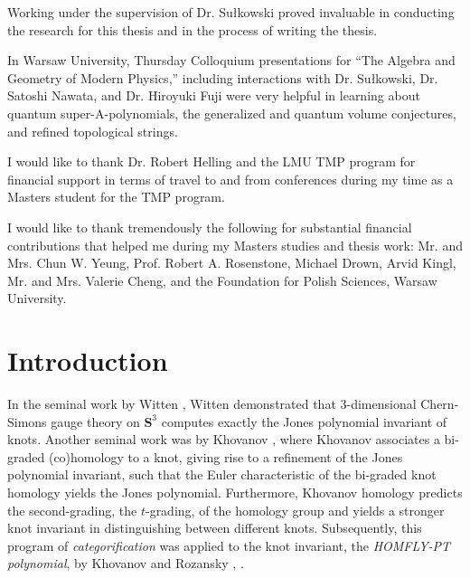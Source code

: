 \documentclass[a4paper,titlepage,twoside]{book}
\begin{document}
Working under the supervision of Dr. Su\l kowski proved invaluable in conducting the research for this thesis and in the process of writing the thesis.  

In Warsaw University, Thursday Colloquium presentations for ``The Algebra and Geometry of Modern Physics,'' including interactions with Dr. Su\l kowski, Dr. Satoshi Nawata, and Dr. Hiroyuki Fuji were very helpful in learning about quantum super-A-polynomials, the generalized and quantum volume conjectures, and refined topological strings.

I would like to thank Dr. Robert Helling and the LMU TMP program for financial support in terms of travel to and from conferences during my time as a Masters student for the TMP program.

I would like to thank tremendously the following for substantial financial contributions that helped me during my Masters studies and thesis work: Mr. and Mrs. Chun W. Yeung, Prof. Robert A. Rosenstone, Michael Drown, Arvid Kingl, Mr. and Mrs. Valerie Cheng, and the Foundation for Polish Sciences, Warsaw University.  


\newpage
\thispagestyle{empty}


\newpage
\tableofcontents


\newpage
\thispagestyle{empty}

\newpage

\chapter{Introduction}

In the seminal work by Witten \cite{Witten1989}, Witten demonstrated that 3-dimensional Chern-Simons gauge theory on $\mathbf{S}^3$ computes exactly the Jones polynomial invariant of knots.  Another seminal work was by Khovanov \cite{Khovanov2000}, where Khovanov associates a bi-graded (co)homology to a knot, giving rise to a refinement of the Jones polynomial invariant, such that the Euler characteristic of the bi-graded knot homology yields the Jones polynomial.  Furthermore, Khovanov homology predicts the second-grading, the $t$-grading, of the homology group and yields a stronger knot invariant in distinguishing between different knots.  Subsequently, this program of \emph{categorification} was applied to the knot invariant, the \emph{HOMFLY-PT polynomial}, by Khovanov and Rozansky \cite{KhovanovRozansky2004}, \cite{KhovanovRozansky2005}. 
\end{document}
